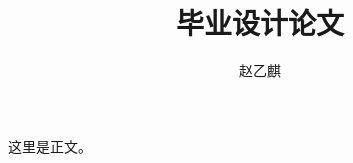 \documentclass[UTF8]{ctexart}
\author{赵乙麒}
\title{毕业设计论文}
\begin{document}
\maketitle
这里是正文。
\end{document}
